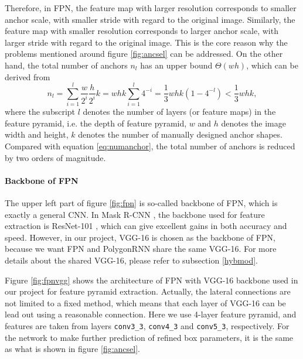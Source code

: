 

Therefore, in FPN, the feature map with larger resolution corresponds to smaller anchor scale, with smaller stride with regard to the original image. Similarly, the feature map with smaller resolution corresponds to larger anchor scale, with larger stride with regard to the original image. This is the core reason why the problems mentioned around figure \ref{fig:ancsel} can be addressed. On the other hand, the total number of anchors $n_l$ has an upper bound $\Theta(wh)$, which can be derived from
\begin{equation}
	n_l = \sum_{i=1}^{l}\frac{w}{2^i}\frac{h}{2^i}k=whk\sum_{i=1}^{l}4^{-i}=\frac{1}{3}whk(1-4^{-l}) < \frac{1}{3}whk,
\end{equation}
where the subscript $l$ denotes the number of layers (or feature maps) in the feature pyramid, i.e. the depth of feature pyramid, $w$ and $h$ denotes the image width and height, $k$ denotes the number of manually designed anchor shapes. Compared with equation \ref{eq:numanchor}, the total number of anchors is reduced by two orders of magnitude.

\paragraph{Backbone of FPN}
The upper left part of figure \ref{fig:fpn} is so-called backbone of FPN, which is exactly a general CNN. In Mask R-CNN \cite{maskrcnn}, the backbone used for feature extraction is ResNet-101 \cite{resnet}, which can give excellent gains in both accuracy and speed. However, in our project, VGG-16 \cite{vgg16} is chosen as the backbone of FPN, because we want FPN and PolygonRNN share the same VGG-16. For more details about the shared VGG-16, please refer to subsection \ref{hybmod}.

Figure \ref{fig:fpnvgg} shows the architecture of FPN with VGG-16 backbone used in our project for feature pyramid extraction. Actually, the lateral connections are not limited to a fixed method, which means that each layer of VGG-16 can be lead out using a reasonable connection. Here we use 4-layer feature pyramid, and features are taken from layers \lstinline{conv3_3}, \lstinline{conv4_3} and \lstinline{conv5_3}, respectively. For the network to make further prediction of refined box parameters, it is the same as what is shown in figure \ref{fig:ancsel}.



\section{\modelnameshort}\label{modmer}

